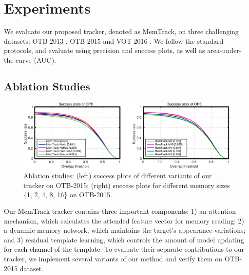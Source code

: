 \documentclass[runningheads]{llncs}
\newcommand{\abc}[1]{\textcolor{black}{#1}}
\begin{document}
\section{Experiments}

We evaluate our proposed tracker, denoted as MemTrack, on three challenging datasets: OTB-2013 \cite{Wu2013}, OTB-2015 \cite{Wu2015} and VOT-2016 \cite{Kristan2016}.  We follow the standard protocols, and evaluate using precision and success plots, as well as area-under-the-curve (AUC).

\subsection{Ablation Studies}\label{abla}


\begin{figure}[t]
	\begin{center}
		\includegraphics[width=0.85\linewidth]{figs/ablation-tb100.pdf}
	\end{center}
	\caption{Ablation studies: (left) success plots of different variants of our tracker on OTB-2015; (right) success plots for different memory sizes \{1, 2, 4, 8, 16\} on OTB-2015. 
	}
	\label{fig:7}
\end{figure}

Our \abc{MemTrack} tracker contains \abc{three important components:} 1) an attention mechanism, which calculates the attended feature vector for memory reading; 2) a dynamic memory network, which maintains the target's appearance variations; and 3) residual template learning, which controls the amount of model updating \abc{for each channel of the template}. To evaluate their separate contributions to our tracker, we implement several variants of our method and verify them on OTB-2015 dataset. 
\end{document}
